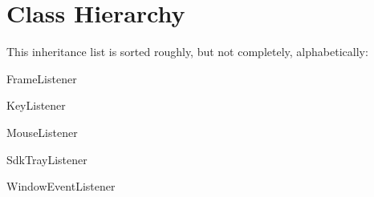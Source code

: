 \section{Class Hierarchy}
This inheritance list is sorted roughly, but not completely, alphabetically\+:\begin{DoxyCompactList}
\item Frame\+Listener\begin{DoxyCompactList}
\item {}
\begin{DoxyCompactList}
\item {}
\end{DoxyCompactList}
\end{DoxyCompactList}
\item Key\+Listener\begin{DoxyCompactList}
\item {}
\end{DoxyCompactList}
\item Mouse\+Listener\begin{DoxyCompactList}
\item {}
\end{DoxyCompactList}
\item Sdk\+Tray\+Listener\begin{DoxyCompactList}
\item {}
\end{DoxyCompactList}
\item Window\+Event\+Listener\begin{DoxyCompactList}
\item {}
\end{DoxyCompactList}
\end{DoxyCompactList}
